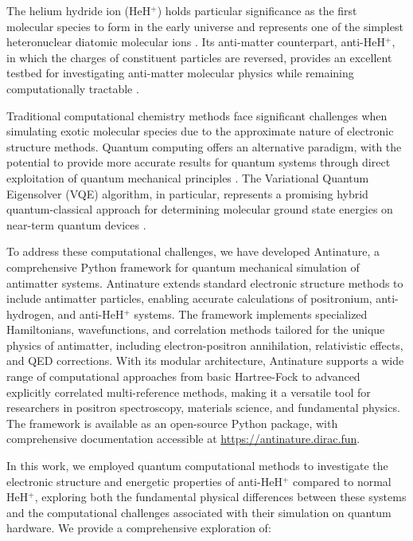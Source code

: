 \documentclass[10pt,twocolumn,a4paper]{article}
\begin{document}
The helium hydride ion (HeH$^+$) holds particular significance as the first molecular species to form in the early universe and represents one of the simplest heteronuclear diatomic molecular ions \cite{lee2019first}. Its anti-matter counterpart, anti-HeH$^+$, in which the charges of constituent particles are reversed, provides an excellent testbed for investigating anti-matter molecular physics while remaining computationally tractable \cite{czachorowski2020towards}.

Traditional computational chemistry methods face significant challenges when simulating exotic molecular species due to the approximate nature of electronic structure methods. Quantum computing offers an alternative paradigm, with the potential to provide more accurate results for quantum systems through direct exploitation of quantum mechanical principles \cite{cao2019quantum}. The Variational Quantum Eigensolver (VQE) algorithm, in particular, represents a promising hybrid quantum-classical approach for determining molecular ground state energies on near-term quantum devices \cite{peruzzo2014variational, mcclean2016theory}.

To address these computational challenges, we have developed Antinature, a comprehensive Python framework for quantum mechanical simulation of antimatter systems. Antinature extends standard electronic structure methods to include antimatter particles, enabling accurate calculations of positronium, anti-hydrogen, and anti-HeH$^+$ systems. The framework implements specialized Hamiltonians, wavefunctions, and correlation methods tailored for the unique physics of antimatter, including electron-positron annihilation, relativistic effects, and QED corrections. With its modular architecture, Antinature supports a wide range of computational approaches from basic Hartree-Fock to advanced explicitly correlated multi-reference methods, making it a versatile tool for researchers in positron spectroscopy, materials science, and fundamental physics. The framework is available as an open-source Python package, with comprehensive documentation accessible at \url{https://antinature.dirac.fun}.

In this work, we employed quantum computational methods to investigate the electronic structure and energetic properties of anti-HeH$^+$ compared to normal HeH$^+$, exploring both the fundamental physical differences between these systems and the computational challenges associated with their simulation on quantum hardware. We provide a comprehensive exploration of:
\end{document}
